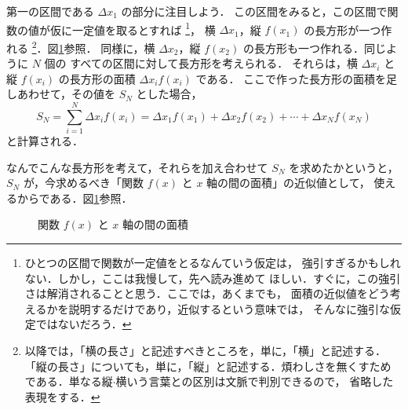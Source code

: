                 第一の区間である $\Delta x_{1}$ の部分に注目しよう．
                この区間をみると，この区間で関数の値が仮に一定値を取るとすれば
                    \footnote{
                        ひとつの区間で関数が一定値をとるなんていう仮定は，
                        強引すぎるかもしれない．しかし，ここは我慢して，先へ読み進めて
                        ほしい．すぐに，この強引さは解消されることと思う．ここでは，あくまでも，
                        面積の近似値をどう考えるかを説明するだけであり，近似するという意味では，
                        そんなに強引な仮定ではないだろう．
                    }，
                横 $\Delta x_{1}$，縦 $f(x_{1})$ の長方形が一つ作れる
                    \footnote{
                        以降では，「横の長さ」と記述すべきところを，単に，「横」と記述する．
                        「縦の長さ」についても，単に，「縦」と記述する．煩わしさを無くすため
                        である．単なる縦$\cdot$横いう言葉との区別は文脈で判別できるので，
                        省略した表現をする．
                    }．図\ref{fig:INTEG_LIM01}参照．
                同様に，横 $\Delta x_{2}$，縦 $f(x_{2})$ の長方形も一つ作れる．同じように $N$ 個の
                すべての区間に対して長方形を考えられる．
                それらは，横 $\Delta x_{i}$ と 縦 $f(x_{i})$ の長方形の面積 $\Delta x_{i}f(x_{i})$ である．
                ここで作った長方形の面積を足しあわせて，その値を $S_{N}$ とした場合，
                    \begin{equation*}
                        S_{N} = \sum_{i=1}^{N}\Delta x_{i}f(x_{i})
                                = \Delta x_{1}f(x_{1}) + \Delta x_{2}f(x_{2}) + \cdots + \Delta x_{N}f(x_{N})
                    \end{equation*}
                と計算される．

                なんでこんな長方形を考えて，それらを加え合わせて $S_{N}$ を求めたかというと，
                $S_{N}$ が，今求めるべき「関数 $f(x)$ と $x$ 軸の間の面積」の近似値として，
                使えるからである．図\ref{fig:INTEG_LIM01}参照．
                    \begin{figure}[hbt]
                        \begin{center}
                            \caption{関数 $f(x)$ と $x$ 軸の間の面積}
                            \label{fig:INTEG_LIM01}
                        \end{center}
                    \end{figure}

